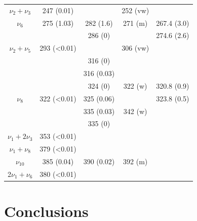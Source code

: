 \begin{table}[htb]
\begin{center}
\begin{tabular}{c c c c c}
 		  $\nu_{2}+\nu_{3}$& 247 (0.01) &  & 252 (vw) & \\
 		  $\nu_{6}$ & 275 (1.03) & 282 (1.6) & 271 (m) & 267.4 (3.0)\\
 		  	&  & 286 (0) &  & 274.6 (2.6)\\
 		  	$\nu_{2}+ \nu_{5}$ & 293 (<0.01) &  & 306 (vw) & \\
 		  	& & 316 (0) & & \\
 		   & & 316 (0.03) & & \\
 		    &  & 324 (0) & 322 (w) & 320.8 (0.9)\\
 		    $\nu_{8}$& 322 (<0.01) & 325 (0.06) & & 323.8 (0.5)\\
 		    &  & 335 (0.03) & 342 (w) & \\
 		    & & 335 (0) & & \\
 		    $\nu_{1}+ 2\nu_{3}$ & 353 (<0.01) & &  & \\	
 		    $\nu_{1}+ \nu_{8}$ & 379 (<0.01) & & & \\
 		    $\nu_{10}$ & 385 (0.04) & 390 (0.02) &  392 (m) & \\
 		    2$\nu_{1}+ \nu_{6}$ & 380 (<0.01) &  & & \\
 		    \bottomrule	    
 		  \end{tabular}
 	\end{center}
 \end{table}
 
 \section*{Conclusions}
 

